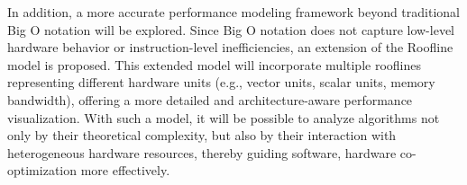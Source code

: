 In addition, a more accurate performance modeling framework beyond traditional Big O notation will be explored. Since Big O notation does not capture low-level hardware behavior or instruction-level inefficiencies, an extension of the Roofline model \cite{DBLP:journals/cacm/WilliamsWP09} is proposed. This extended model will incorporate multiple rooflines representing different hardware units (e.g., vector units, scalar units, memory bandwidth), offering a more detailed and architecture-aware performance visualization. With such a model, it will be possible to analyze algorithms not only by their theoretical complexity, but also by their interaction with heterogeneous hardware resources, thereby guiding software, hardware co-optimization more effectively.